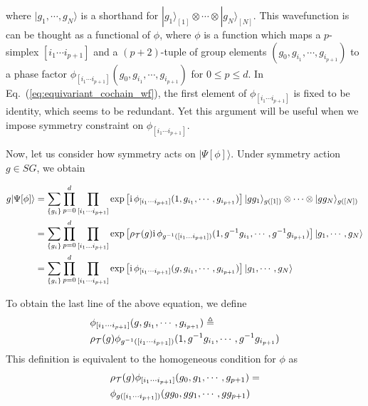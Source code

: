 \documentclass[%
 reprint,
 amsmath,amssymb,
 aps,pra,
]{revtex4-1}
\newcommand{\ii}{\mathrm{i}\,} %
\newcommand{\TT}{\mathcal{T}} %
\begin{document}
where $|g_1,\cdots,g_N\rangle$ is a shorthand for $|g_1\rangle_{[1]}\otimes\cdots\otimes|g_N\rangle_{[N]}$.
This wavefunction is can be thought as a functional of $\phi$, where $\phi$ is a function which maps a $p$-simplex $[i_1\cdots i_{p+1}]$ and a $(p+2)$-tuple of group elements $(g_0,g_{i_1},\cdots,g_{i_{p+1}})$ to a phase factor $\phi_{[i_1\cdots i_{p+1}]}(g_0,g_{i_1},\cdots,g_{i_{p+1}})$ for $0\le p\le d$.
In Eq.~(\ref{eq:equivariant_cochain_wf}), the first element of $\phi_{[i_1\cdots i_{p+1}]}$ is fixed to be identity, which seems to be redundant.
Yet this argument will be useful when we impose symmetry constraint on $\phi_{[i_1\cdots i_{p+1}]}$.

Now, let us consider how symmetry acts on $|\Psi[\phi]\rangle$.
Under symmetry action $g\in SG$, we obtain
\begin{widetext}
  \begin{align}
    g|\Psi[\phi]\rangle&=\sum_{\{g_i\}}\prod_{p=0}^d \prod_{[i_1\cdots i_{p+1}]} \exp\left[ \ii \phi_{[i_1\cdots i_{p+1}]}(1,g_{i_1},\cdots,g_{i_{p+1}}) \right] |gg_1\rangle_{g([1])}\otimes\cdots\otimes|gg_N\rangle_{g([N])}\notag\\
    &=\sum_{\{g_i\}}\prod_{p=0}^d \prod_{[i_1\ldots i_{p+1}]} \exp\left[ \rho_{\TT}(g)\ii \phi_{g^{-1}([i_1\ldots i_{p+1}])}(1,g^{-1}g_{i_1},\cdots,g^{-1}g_{i_{p+1}}) \right] |g_1,\cdots,g_N\rangle\notag\\
    &=\sum_{\{g_i\}}\prod_{p=0}^d \prod_{[i_1\cdots i_{p+1}]} \exp\left[ \ii \phi_{[i_1\cdots i_{p+1}]}(g,g_{i_1},\cdots,g_{i_{p+1}}) \right] |g_1,\cdots,g_N\rangle
    \label{eq:sym_action_equivariant_cochain_wf}
  \end{align}
\end{widetext}
To obtain the last line of the above equation, we define
\begin{align}
  &\phi_{[i_1\cdots i_{p+1}]}(g,g_{i_1},\cdots,g_{i_{p+1}})\triangleq\notag\\
  &\rho_{\TT}(g) \phi_{g^{-1}([i_1\cdots i_{p+1}])}(1,g^{-1}g_{i_1},\cdots,g^{-1}g_{i_{p+1}})
  \label{}
\end{align}
This definition is equivalent to the homogeneous condition for $\phi$ as
\begin{align}
  &\rho_{\TT}(g)\phi_{[i_1\cdots i_{p+1}]}(g_0,g_1,\cdots,g_{p+1})=\notag\\
  &\phi_{g([i_1\cdots i_{p+1}])}(gg_0,gg_1,\cdots,gg_{p+1})
  \label{eq:equivariant_cochain_condition}
\end{align}
\end{document}

